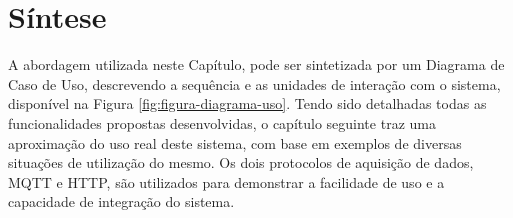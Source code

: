 \section{Síntese}
\label{sec:sintese-rscada}

A abordagem utilizada neste Capítulo, pode ser sintetizada por um Diagrama de Caso de Uso, descrevendo a sequência e as unidades de interação com o sistema, disponível na Figura \ref{fig:figura-diagrama-uso}. Tendo sido detalhadas todas as funcionalidades propostas desenvolvidas, o capítulo seguinte traz uma aproximação do uso real deste sistema, com base em exemplos de diversas situações de utilização do mesmo. Os dois protocolos de aquisição de dados, \gls{MQTT} e \gls{HTTP}, são utilizados para demonstrar a facilidade de uso e a capacidade de integração do sistema.

        \begin{figure}[!h]
    	\end{figure}
    	